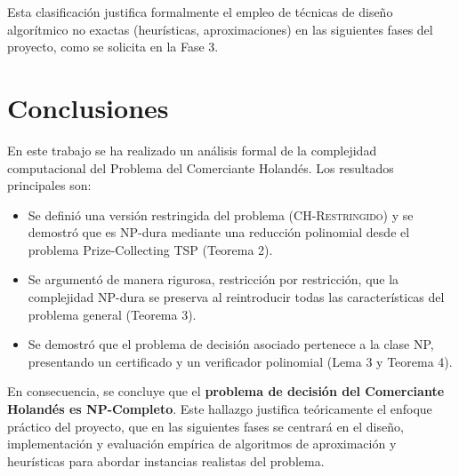 \documentclass{article}
\begin{document}
Esta clasificación justifica formalmente el empleo de técnicas de diseño
algorítmico no exactas (heurísticas, aproximaciones) en las siguientes fases del
proyecto, como se solicita en la Fase 3.

\section{Conclusiones}
\label{sec:conclusiones}

En este trabajo se ha realizado un análisis formal de la complejidad computacional del Problema del Comerciante Holandés. Los resultados principales son:
\begin{itemize}
    \item Se definió una versión restringida del problema (\textsc{CH-Restringido}) y se demostró que es NP-dura mediante una reducción polinomial desde el problema Prize-Collecting TSP (Teorema 2).
    \item Se argumentó de manera rigurosa, restricción por restricción, que la complejidad NP-dura se preserva al reintroducir todas las características del problema general (Teorema 3).
    \item Se demostró que el problema de decisión asociado pertenece a la clase NP, presentando un certificado y un verificador polinomial (Lema 3 y Teorema 4).
\end{itemize}
En consecuencia, se concluye que el \textbf{problema de decisión del Comerciante Holandés es NP-Completo}. Este hallazgo justifica teóricamente el enfoque práctico del proyecto, que en las siguientes fases se centrará en el diseño, implementación y evaluación empírica de algoritmos de aproximación y heurísticas para abordar instancias realistas del problema.



\end{document}
